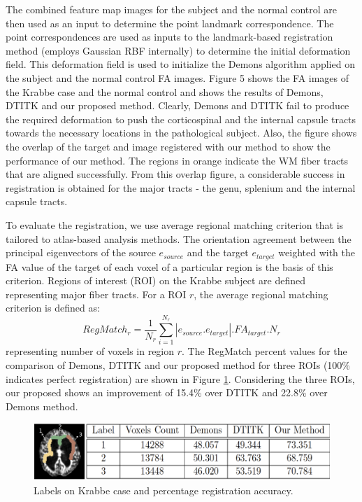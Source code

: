 \documentclass{llncs}
\begin{document}
The combined feature map images for the subject and the normal control are then used as an input to determine the point landmark correspondence. The point correspondences are used as inputs to the landmark-based registration method (employs Gaussian RBF internally) to determine the initial deformation field. This deformation field is used to initialize the Demons algorithm applied on the subject and the normal control FA images. Figure 5 shows the FA images of the Krabbe case and the normal control and shows the results of Demons, DTITK and our proposed method. Clearly, Demons and DTITK fail to produce the required deformation to push the corticospinal and the internal capsule tracts towards the necessary locations in the pathological subject. Also, the figure shows the overlap of the target and image registered with our method to show the performance of our method. The regions in orange indicate the WM fiber tracts that are aligned successfully. From this overlap figure, a considerable success in registration is obtained for the major tracts - the genu, splenium and the internal capsule tracts.

To evaluate the registration, we use average regional matching criterion that is tailored to atlas-based analysis methods. The orientation agreement between the principal eigenvectors of the source $e_{source}$ and the target $e_{target}$ weighted with the FA value of the target of each voxel of a particular region is the basis of this criterion. Regions of interest (ROI) on the Krabbe subject are defined representing major fiber tracts. For a ROI $r$, the average regional matching criterion is defined as: 
\begin{equation}
RegMatch_{r} = \frac{1}{N_{r}} \sum_{i=1}^{N_{r}} |e_{source}.e_{target}|.FA_{target}. N_{r}
\end{equation}
representing number of voxels in region $r$. The RegMatch percent values for the comparison of Demons, DTITK and our proposed method for three ROIs (100\% indicates perfect registration) are shown in Figure \ref{fig:Label_Table}. Considering the three ROIs, our proposed shows an improvement of 15.4\% over DTITK and 22.8\% over Demons method. 

\begin{figure}[htb]
\includegraphics[width=1.0\columnwidth]{images/Table_LabelMapMod2.png}
\centering
\caption{Labels on Krabbe case and percentage registration accuracy.}
\label{fig:Label_Table}
\end{figure}
\end{document}
